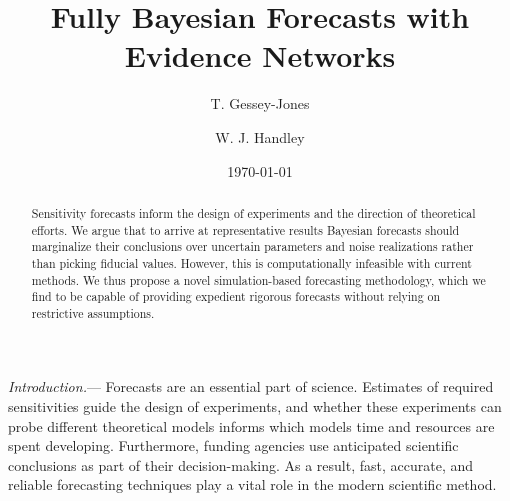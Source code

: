 \documentclass[twocolumn,english,aps,prl,amsmath,amssymb,reprint,footinbib,floatfix,showkeys]{revtex4-2}
\begin{document}

\title{Fully Bayesian Forecasts with Evidence Networks}

\author{T. Gessey-Jones}
    
\author{W. J. Handley}
    

\date{\today}%






\begin{abstract}
Sensitivity forecasts inform the design of experiments and the direction of theoretical efforts. We argue that to arrive at representative results Bayesian forecasts should marginalize their conclusions over uncertain parameters and noise realizations rather than picking fiducial values. However, this is computationally infeasible with current methods. We thus propose a novel simulation-based forecasting methodology, which we find to be capable of providing expedient rigorous forecasts without relying on restrictive assumptions.
\end{abstract}

\maketitle

\textit{Introduction.}---
Forecasts are an essential part of science.
Estimates of required sensitivities guide the design of experiments, and whether these experiments can probe different theoretical models informs which models time and resources are spent developing. 
Furthermore, funding agencies use anticipated scientific conclusions as part of their decision-making. 
As a result, fast, accurate, and reliable forecasting techniques play a vital role in the modern scientific method.
\end{document}
